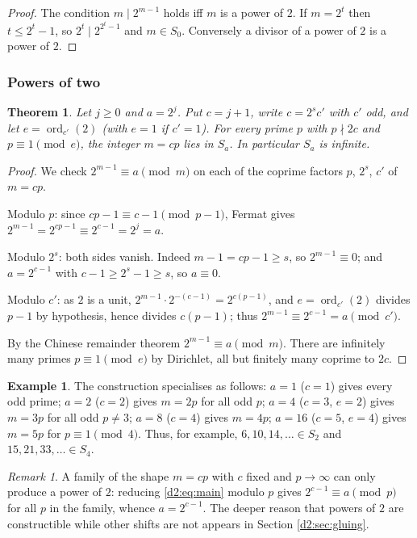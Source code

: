 \documentclass[a4paper]{article}
\theoremstyle{plain}
\newtheorem{theorem}{Theorem}[subsection]
\theoremstyle{definition}
\newtheorem{example}{Example}[subsection]
\theoremstyle{remark}
\newtheorem{remark}{Remark}[subsection]
\newcommand{\ord}{\operatorname{ord}}
\newcommand{\dvd}{\mid}
\newcommand{\Sa}{S_a}
\begin{document}
\begin{proof}
The condition $m\dvd 2^{m-1}$ holds iff $m$ is a power of $2$. If $m=2^{t}$ then $t\le 2^{t}-1$, so $2^{t}\dvd2^{2^{t}-1}$ and $m\in S_0$. Conversely a divisor of a power of $2$ is a power of $2$.
\end{proof}

\subsubsection{Powers of two}

\begin{theorem}\label{d2:thm:powers}
Let $j\ge0$ and $a=2^{j}$. Put $c=j+1$, write $c=2^{s}c'$ with $c'$ odd, and let $e=\ord_{c'}(2)$ (with $e=1$ if $c'=1$). For every prime $p$ with $p\nmid 2c$ and $p\equiv1\pmod e$, the integer $m=cp$ lies in $\Sa$. In particular $\Sa$ is infinite.
\end{theorem}

\begin{proof}
We check $2^{m-1}\equiv a\pmod m$ on each of the coprime factors $p$, $2^{s}$, $c'$ of $m=cp$.

Modulo $p$: since $cp-1\equiv c-1\pmod{p-1}$, Fermat gives $2^{m-1}=2^{cp-1}\equiv2^{c-1}=2^{j}=a$.

Modulo $2^{s}$: both sides vanish. Indeed $m-1=cp-1\ge s$, so $2^{m-1}\equiv0$; and $a=2^{c-1}$ with $c-1\ge 2^{s}-1\ge s$, so $a\equiv0$.

Modulo $c'$: as $2$ is a unit, $2^{m-1}\cdot 2^{-(c-1)}=2^{c(p-1)}$, and $e=\ord_{c'}(2)$ divides $p-1$ by hypothesis, hence divides $c(p-1)$; thus $2^{m-1}\equiv2^{c-1}=a\pmod{c'}$.

By the Chinese remainder theorem $2^{m-1}\equiv a\pmod m$. There are infinitely many primes $p\equiv1\pmod e$ by Dirichlet, all but finitely many coprime to $2c$.
\end{proof}

\begin{example}
The construction specialises as follows: $a=1$ ($c=1$) gives every odd prime; $a=2$ ($c=2$) gives $m=2p$ for all odd $p$; $a=4$ ($c=3$, $e=2$) gives $m=3p$ for all odd $p\ne3$; $a=8$ ($c=4$) gives $m=4p$; $a=16$ ($c=5$, $e=4$) gives $m=5p$ for $p\equiv1\pmod4$. Thus, for example, $6,10,14,\dots\in S_2$ and $15,21,33,\dots\in S_4$.
\end{example}

\begin{remark}\label{d2:rem:onlypowers}
A family of the shape $m=cp$ with $c$ fixed and $p\to\infty$ can only produce a power of $2$: reducing \eqref{d2:eq:main} modulo $p$ gives $2^{c-1}\equiv a\pmod p$ for all $p$ in the family, whence $a=2^{c-1}$. The deeper reason that powers of $2$ are constructible while other shifts are not appears in Section \ref{d2:sec:gluing}.
\end{remark}
\end{document}

